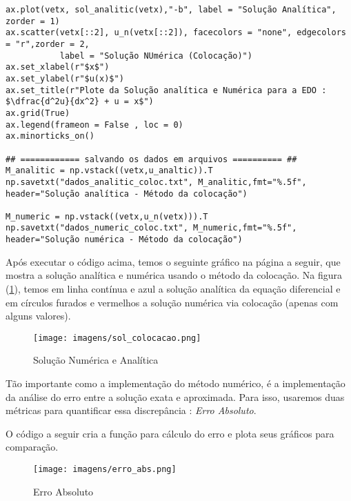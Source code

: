 \documentclass[a4paper, 12pt]{article}
\numberwithin{equation}{section}
\begin{document}
\begin{lstlisting}
ax.plot(vetx, sol_analitic(vetx),"-b", label = "Solução Analítica", zorder = 1)
ax.scatter(vetx[::2], u_n(vetx[::2]), facecolors = "none", edgecolors = "r",zorder = 2,
           label = "Solução NUmérica (Colocação)")
ax.set_xlabel(r"$x$")
ax.set_ylabel(r"$u(x)$")
ax.set_title(r"Plote da Solução analítica e Numérica para a EDO : $\dfrac{d^2u}{dx^2} + u = x$")
ax.grid(True)
ax.legend(frameon = False , loc = 0)
ax.minorticks_on() 

## ============ salvando os dados em arquivos ========== ## 
M_analitic = np.vstack((vetx,u_analtic)).T 
np.savetxt("dados_analitic_coloc.txt", M_analitic,fmt="%.5f", header="Solução analítica - Método da colocação")

M_numeric = np.vstack((vetx,u_n(vetx))).T 
np.savetxt("dados_numeric_coloc.txt", M_numeric,fmt="%.5f", header="Solução numérica - Método da colocação")

\end{lstlisting}


Após executar o código acima, temos o seguinte gráfico na página a seguir, que mostra a solução analítica e numérica usando o método da colocação. Na figura (\ref{fig:colocacao}), temos em linha contínua e azul a solução analítica da equação diferencial e em círculos furados e vermelhos a solução numérica via colocação (apenas com alguns valores). 



\begin{figure}[!htp]
    \centering
    \texttt{[image: imagens/sol\_colocacao.png]}
    \caption{Solução Numérica e Analítica}
    \label{fig:colocacao}
\end{figure}


Tão importante como a implementação do método numérico, é a implementação da análise do erro entre a solução exata e aproximada. Para isso, usaremos duas métricas para quantificar essa discrepância : \textit{Erro Absoluto}.

O código a seguir cria a função para cálculo do erro e plota seus gráficos para comparação. 

\begin{figure}[H]
    \centering
    \texttt{[image: imagens/erro\_abs.png]}
    \caption{Erro Absoluto}
    \label{fig:err_abs}
\end{figure}



\vspace{2cm}
\end{document}
